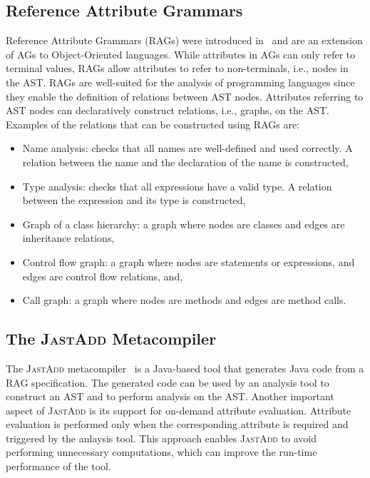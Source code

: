 \subsection{Reference Attribute Grammars}%
\label{sec:rag}
Reference Attribute Grammars (RAGs) were introduced in~\cite{DBLP:journals/informaticaSI/Hedin00}
and are an extension of AGs to Object-Oriented languages. While attributes in AGs
can only refer to terminal values, RAGs allow attributes to refer to non-terminals, i.e., nodes in the AST.
RAGs are well-suited for the analysis of programming languages since they enable
the definition of relations between AST nodes. Attributes referring
to AST nodes can declaratively construct relations, i.e., graphs, on the AST.
Examples of the relations that can be constructed using RAGs are:
\begin{itemize}
    \item Name analysis: checks that all names are well-defined and used correctly. A relation between
    the name and the declaration of the name is constructed,
    \item Type analysis: checks that all expressions have a valid type. A relation between the expression
    and its type is constructed,
    \item Graph of a class hierarchy: a graph where nodes are classes and edges are inheritance relations,
    \item Control flow graph: a graph where nodes are statements or expressions, and edges are control flow relations, and,
    \item Call graph: a graph where nodes are methods and edges are method calls.
\end{itemize}



\subsection{The \textsc{JastAdd} Metacompiler}%
\label{sec:jastadd}
The \textsc{JastAdd} metacompiler~\cite{DBLP:journals/entcs/HedinM01} is a Java-based tool that generates
Java code from a RAG specification. The generated code can be used by an analysis tool to construct an AST and to perform
analysis on the AST.
Another important aspect of \textsc{JastAdd} is its support for on-demand attribute evaluation.
Attribute evaluation is performed only when the corresponding
attribute is required and triggered by the anlaysis tool. This approach enables \textsc{JastAdd} to
avoid performing unnecessary computations, which can improve the run-time
performance of the tool.

